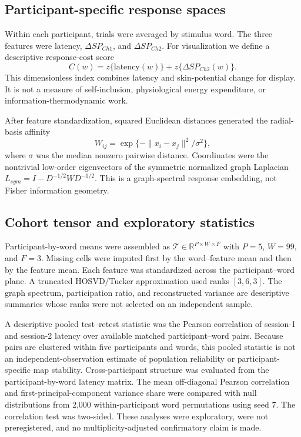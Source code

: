 \documentclass[a4paper,12pt]{article}
\begin{document}
\subsection{Participant-specific response spaces}
Within each participant, trials were averaged by stimulus word. The three features were latency, $\Delta SP_{Ch1}$, and $\Delta SP_{Ch2}$. For visualization we define a descriptive response-cost score
\begin{equation}
C(w)=z\{\mathrm{latency}(w)\}+z\{\Delta SP_{Ch2}(w)\}.
\end{equation}
This dimensionless index combines latency and skin-potential change for display. It is not a measure of self-inclusion, physiological energy expenditure, or information-thermodynamic work.

After feature standardization, squared Euclidean distances generated the radial-basis affinity
\begin{equation}
W_{ij}=\exp\{-\lVert x_i-x_j\rVert^2/\sigma^2\},
\end{equation}
where $\sigma$ was the median nonzero pairwise distance. Coordinates were the nontrivial low-order eigenvectors of the symmetric normalized graph Laplacian $L_{sym}=I-D^{-1/2}WD^{-1/2}$. This is a graph-spectral response embedding, not Fisher information geometry.

\subsection{Cohort tensor and exploratory statistics}
Participant-by-word means were assembled as $\mathcal{T}\in\mathbb{R}^{P\times W\times F}$ with $P=5$, $W=99$, and $F=3$. Missing cells were imputed first by the word--feature mean and then by the feature mean. Each feature was standardized across the participant--word plane. A truncated HOSVD/Tucker approximation \citep{KoldaBader2009} used ranks $[3,6,3]$. The graph spectrum, participation ratio, and reconstructed variance are descriptive summaries whose ranks were not selected on an independent sample.

A descriptive pooled test--retest statistic was the Pearson correlation of session-1 and session-2 latency over available matched participant--word pairs. Because pairs are clustered within five participants and words, this pooled statistic is not an independent-observation estimate of population reliability or participant-specific map stability. Cross-participant structure was evaluated from the participant-by-word latency matrix. The mean off-diagonal Pearson correlation and first-principal-component variance share were compared with null distributions from 2,000 within-participant word permutations using seed 7. The correlation test was two-sided. These analyses were exploratory, were not preregistered, and no multiplicity-adjusted confirmatory claim is made.
\end{document}
